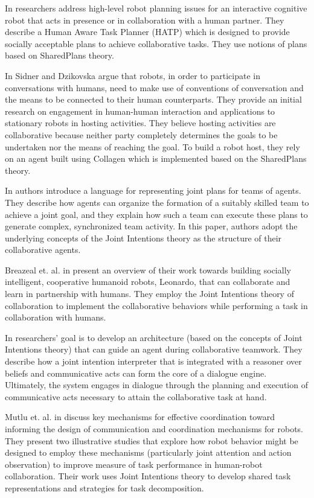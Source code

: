 \documentclass[11pt]{article}
\begin{document}
In \cite{montreuil:planning-robot-activity} researchers address high-level robot
planning issues for an interactive cognitive robot that acts in presence or in
collaboration with a human partner. They describe a Human Aware Task Planner
(HATP) which is designed to provide socially acceptable plans to achieve
collaborative tasks. They use notions of plans based on SharedPlans theory.

In \cite{sidner:enagagement-robot} Sidner and Dzikovska argue that robots, in
order to participate in conversations with humans, need to make use of
conventions of conversation and the means to be connected to their human
counterparts. They provide an initial research on engagement in human-human
interaction and applications to stationary robots in hosting activities. They
believe hosting activities are collaborative because neither party completely
determines the goals to be undertaken nor the means of reaching the goal. To
build a robot host, they rely on an agent built using Collagen which is
implemented based on the SharedPlans theory.

In \cite{kinny:planned-team} authors introduce a language for representing joint
plans for teams of agents. They describe how agents can organize the formation
of a suitably skilled team to achieve a joint goal, and they explain how such a
team can execute these plans to generate complex, synchronized team activity. In
this paper, authors adopt the underlying concepts of the Joint Intentions theory
as the structure of their collaborative agents.

Breazeal et. al. in \cite{breazeal:humanoid-robots} present an overview of their
work towards building socially intelligent, cooperative humanoid robots,
Leonardo, that can collaborate and learn in partnership with humans. They employ
the Joint Intentions theory of collaboration to implement the collaborative
behaviors while performing a task in collaboration with humans.

In \cite{subramanian:joint-intention-dialogue} researchers' goal is to develop
an architecture (based on the concepts of Joint Intentions theory) that can
guide an agent during collaborative teamwork. They describe how a joint
intention interpreter that is integrated with a reasoner over beliefs and
communicative acts can form the core of a dialogue engine. Ultimately, the
system engages in dialogue through the planning and execution of communicative
acts necessary to attain the collaborative task at hand.

Mutlu et. al. in \cite{mutlu:coordination-robot} discuss key mechanisms for
effective coordination toward informing the design of communication and
coordination mechanisms for robots. They present two illustrative studies that
explore how robot behavior might be designed to employ these mechanisms
(particularly joint attention and action observation) to improve measure of task
performance in human-robot collaboration. Their work uses Joint Intentions
theory to develop shared task representations and strategies for task
decomposition.
\end{document}
